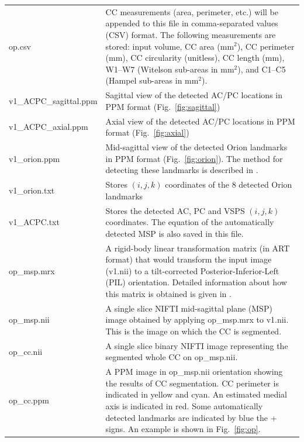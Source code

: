 \documentclass[11pt]{article}
\begin{document}
\begin{longtable}{p{}p{}}
op.csv & CC measurements (area, perimeter, etc.) will be 
appended to this file in comma-separated values (CSV) format.
The following measurements are stored: input volume, CC area (mm${}^2$), 
CC perimeter (mm), CC circularity (unitless),
CC length (mm), W1--W7 (Witelson sub-areas in mm${}^2$), 
and C1--C5 (Hampel sub-areas in mm${}^2$). \\

v1\_ACPC\_sagittal.ppm &
	Sagittal view of the detected AC/PC locations in
	PPM format (Fig.\ \ref{fig:sagittal}) \\

v1\_ACPC\_axial.ppm &
	Axial view of the detected AC/PC locations in PPM
	format (Fig.\ \ref{fig:axial}) \\

v1\_orion.ppm &
	Mid-sagittal view of the detected Orion landmarks in
	PPM format (Fig.\ \ref{fig:orion}).
	The method for detecting these landmarks is described in \citep{pmid35288224}. \\

v1\_orion.txt &
	Stores $(i, j, k)$ coordinates of the 8 detected Orion landmarks \\

v1\_ACPC.txt &
	Stores the detected AC, PC and VSPS $(i, j, k)$ coordinates.
	The equation of the automatically detected MSP is also saved in this file. \\

op\_msp.mrx & A rigid-body linear transformation matrix (in ART format) that
would transform the input image (v1.nii) to a tilt-corrected Posterior-Inferior-Left (PIL) 
orientation.  Detailed information about how this matrix is obtained 
is given in \citep{pmid35288224}.\\

op\_msp.nii &  A single slice NIFTI mid-sagittal plane (MSP) image obtained by 
applying op\_msp.mrx to v1.nii. This is the image on which the CC is segmented.  \\

op\_cc.nii &  A single slice binary NIFTI image representing the segmented whole CC
on op\_msp.nii. \\

op\_cc.ppm &  A PPM image in op\_msp.nii orientation showing the results of CC
segmentation.  CC perimeter is indicated in yellow and cyan.  An estimated medial axis
is indicated in red.  Some automatically detected landmarks are indicated by blue the
+ signs. An example is shown in Fig.\ \ref{fig:op}.
\\


\end{longtable}
\end{document}
